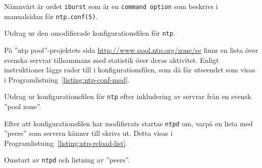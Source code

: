 Nämnvärt är ordet \texttt{iburst} som är en \texttt{command option} som 
beskrivs i manualsidan för \texttt{ntp.conf(5)}.


\begin{listing}[H]
\caption{Utdrag ur den omodifierade konfigurationsfilen för \texttt{ntp}.}
\label{listing:ntp-conf}
\end{listing}

På ''ntp pool''-projektets sida \url{http://www.pool.ntp.org/zone/se} finns en
lista över svenska servrar tillsammans med statistik över deras aktivitet.
Enligt instruktioner läggs rader till i konfigurationsfilen, som då får
utseendet som visas i Programlistning~\ref{listing:ntp-conf-mod}.

\begin{listing}[H]
\caption{Utdrag ur konfigurationsfilen för \texttt{ntp} efter inkludering av
servrar från en svensk ''pool zone''.}
\label{listing:ntp-conf-mod}
\end{listing}

Efter att konfigurationsfilen har modifierats startas \texttt{ntpd} om,
varpå en lista med ''peers'' som servern känner till skrivs ut. Detta
visas i Programlistning~\ref{listing:ntp-reload-list}.

\begin{listing}[H]
\caption{Omstart av \texttt{ntpd} och listning av ''peers''.}
\label{listing:ntp-reload-list}
\end{listing}
